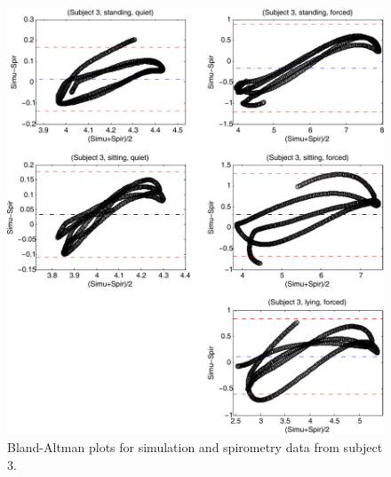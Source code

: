 \begin{figure}[H]
	\centering
	 \includegraphics[width=1\textwidth]{pics/ba_p3_det}
	\caption[Bland-Altman plots for simulation and spirometry data from subject 3]{\label{appB:fig:p3}Bland-Altman plots for simulation and spirometry data from subject 3.}
\end{figure}